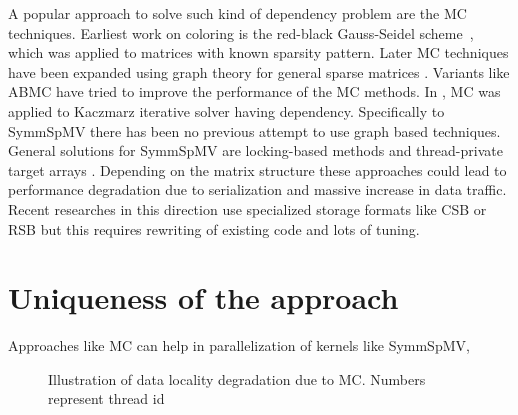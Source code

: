 A popular approach to solve such kind of dependency problem are  the
\acrfull{MC} techniques. Earliest work on coloring is the red-black 
Gauss-Seidel scheme~\cite{RBGS}, which was applied to  matrices with
 known sparsity pattern. 
Later \acrlong{MC} techniques have been expanded using graph theory
for general sparse matrices \cite{MC, COLPACK}.
Variants like \acrfull{ABMC} \cite{ABMC} have tried to improve the performance 
of the \acrshort{MC} methods. 
In \cite{feast_mc}, \acrshort{MC} was applied to Kaczmarz iterative solver
having \DTWO dependency.
Specifically to \acrshort{SymmSpMV} there has been no previous attempt to use 
graph based techniques. General solutions for \acrshort{SymmSpMV} are 
locking-based methods and thread-private target arrays \cite{sparseX,thread_private_symm_spmv}.
Depending on the matrix structure these approaches could lead to performance
 degradation  due to serialization and massive increase in data traffic.
Recent researches in this direction use specialized storage formats like
 CSB \cite{CSB} or RSB \cite{RSB} but this requires rewriting of existing 
 code and lots of tuning. 

 

\section{Uniqueness of the approach} \label{sec:uniqueness}
Approaches like \acrshort{MC} can help in parallelization of kernels like \acrshort{SymmSpMV},
\begin{figure}[tb]
	\centering
	\hspace{0.5em}
	\caption{\label{fig:mc_problem} Illustration of data locality degradation due to \acrshort{MC}.
		Numbers represent thread id}
\end{figure}


